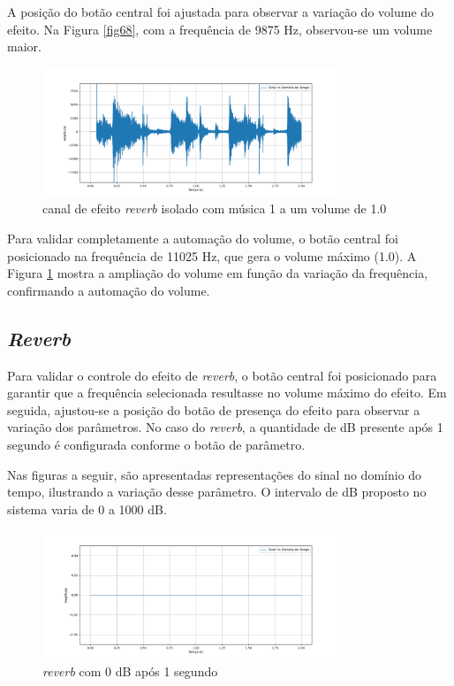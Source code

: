 A posição do botão central foi ajustada para observar a variação do volume do efeito. Na Figura \ref{fig68}, com a frequência de 9875 Hz, observou-se um volume maior.

\begin{figure}[h]
    \centering
    \includegraphics[width=0.8\textwidth]{figuras/fig69.png}
    \caption{canal de efeito \textit{reverb} isolado com música 1 a um volume de 1.0}
    \label{fig69}
\end{figure}
Para validar completamente a automação do volume, o botão central foi posicionado na frequência de 11025 Hz, que gera o volume máximo (1.0). A Figura \ref{fig69} mostra a ampliação do volume em função da variação da frequência, confirmando a automação do volume.

\subsection{\textit{Reverb}}

Para validar o controle do efeito de \textit{reverb}, o botão central foi posicionado para garantir que a frequência selecionada resultasse no volume máximo do efeito. Em seguida, ajustou-se a posição do botão de presença do efeito para observar a variação dos parâmetros. No caso do \textit{reverb}, a quantidade de dB presente após 1 segundo é configurada conforme o botão de parâmetro.

Nas figuras a seguir, são apresentadas representações do sinal no domínio do tempo, ilustrando a variação desse parâmetro. O intervalo de dB proposto no sistema varia de 0 a 1000 dB.


\begin{figure}[h]
    \centering
    \includegraphics[width=0.8\textwidth]{figuras/fig70.png}
    \caption{\textit{reverb} com 0 dB após 1 segundo}
    \label{fig70}
\end{figure}

